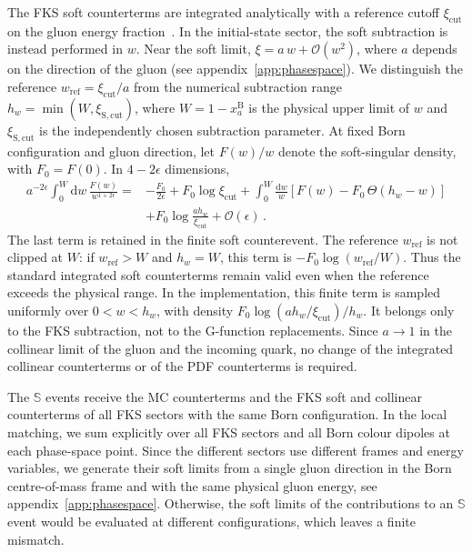 \documentclass[a4paper,11pt]{article}
\newcommand{\dd}{\mathrm{d}}
\newcommand{\order}[1]{\mathcal{O}(#1)}
\newcommand{\clS}{\mathbb{S}}
\begin{document}
The FKS soft counterterms are integrated analytically with a reference
cutoff $\xi_{\mathrm{cut}}$ on the gluon energy
fraction~\cite{Frixione:1995ms}. In the initial-state sector, the soft
subtraction is instead performed in $w$. Near the soft limit,
$\xi=a\,w+\order{w^2}$, where $a$ depends on the direction of the gluon
(see appendix~\ref{app:phasespace}). We distinguish the reference
$w_{\mathrm{ref}}=\xi_{\mathrm{cut}}/a$ from the numerical subtraction
range $h_w=\min(W,\xi_{\mathrm{S,cut}})$, where
$W=1-x_a^{\mathrm{B}}$ is the physical upper limit of $w$ and
$\xi_{\mathrm{S,cut}}$ is the independently chosen subtraction
parameter. At fixed Born configuration and gluon direction, let
$F(w)/w$ denote the soft-singular density, with $F_0=F(0)$. In
$4-2\epsilon$ dimensions,
\begin{align}
 a^{-2\epsilon}\int_0^W\!\dd w\,\frac{F(w)}{w^{1+2\epsilon}}
 ={}&-\frac{F_0}{2\epsilon}+F_0\log\xi_{\mathrm{cut}}
 +\int_0^W\!\frac{\dd w}{w}
       \left[F(w)-F_0\,\Theta(h_w-w)\right]\nonumber\\
 &+F_0\log\frac{a h_w}{\xi_{\mathrm{cut}}}
 +\order{\epsilon}\,.
 \label{eq:softreference}
\end{align}
The last term is retained in the finite soft counterevent. The
reference $w_{\mathrm{ref}}$ is not clipped at $W$: if
$w_{\mathrm{ref}}>W$ and $h_w=W$, this term is
$-F_0\log(w_{\mathrm{ref}}/W)$. Thus the standard integrated soft
counterterms remain valid even when the reference exceeds the
physical range. In the implementation, this finite term is sampled
uniformly over $0<w<h_w$, with density
$F_0\log(a h_w/\xi_{\mathrm{cut}})/h_w$. It belongs only to the FKS
subtraction, not to the G-function replacements. Since $a\to1$ in
the collinear limit of the gluon and the incoming quark, no change
of the integrated collinear counterterms or of the PDF counterterms
is required.

The $\clS$ events receive the MC counterterms and the FKS soft and
collinear counterterms of all FKS sectors with the same Born
configuration. In the local matching, we sum explicitly over all FKS
sectors and all Born colour dipoles at each phase-space point. Since
the different sectors use different frames and energy variables, we
generate their soft limits from a single gluon direction in the Born
centre-of-mass frame and with the same physical gluon energy, see
appendix~\ref{app:phasespace}. Otherwise, the soft limits of the
contributions to an $\clS$ event would be evaluated at different
configurations, which leaves a finite mismatch.
\end{document}
